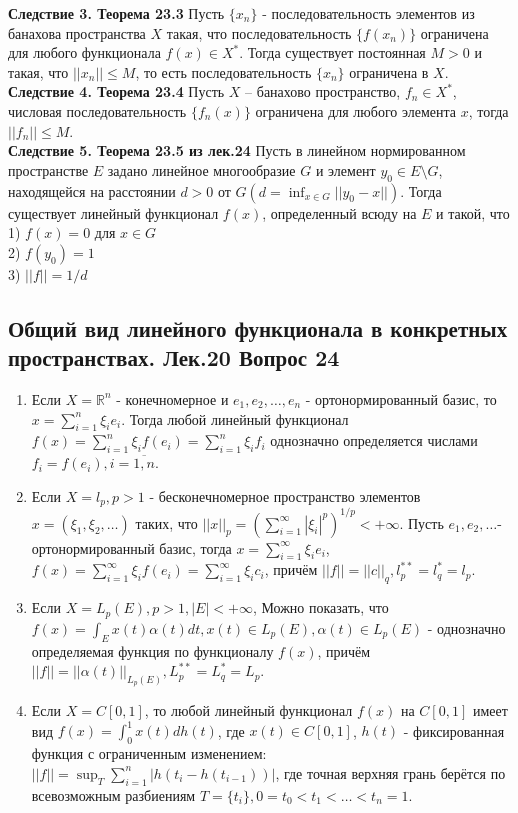 \documentclass{article}
\begin{document}
	\textbf{Следствие 3. Теорема 23.3} Пусть $\{{x}_{n}\}$ - последовательность элементов из банахова пространства $X$ такая, что последовательность $\{f({x}_{n})\}$ ограничена для любого функционала $f(x)\in {X}^{*}$. Тогда существует постоянная $M>0$ и такая, что $||{x}_{n}||\le M$, то есть последовательность $\{{x}_{n}\}$ ограничена в $X$.\\
	\textbf{Следствие 4. Теорема 23.4} Пусть $X$ – банахово пространство, ${f}_{n}\in {X}^{*}$, числовая последовательность $\{{f}_{n}(x)\}$ ограничена для любого элемента $x$, тогда $||{f}_{n}||\le M$.\\
	\textbf{Следствие 5. Теорема 23.5 из лек.24} Пусть в линейном нормированном пространстве $E$ задано линейное многообразие $G$ и элемент ${y}_{0}\in E\setminus G$, находящейся на расстоянии $d>0$ от $G(d=\inf_{x\in G} ||{y}_{0}-x||)$. Тогда существует линейный функционал $f(x)$, определенный всюду на $E$ и такой, что \\
	1) $f(x)=0$ для $x\in G$\\
	2) $f({y}_{0})=1$\\
	3) $||f||=1/d$\\
\subsection{Общий вид линейного функционала в конкретных пространствах. Лек.20 \textbf{Вопрос 24}}
	\begin{enumerate}
		\item Если $X={\mathbb{R}}^{n}$ - конечномерное и ${e}_{1},{e}_{2},\ldots,{e}_{n}$ - ортонормированный базис, то $x=\sum_{i=1}^{n} \xi_{i}{e}_{i}$. Тогда любой линейный функционал $f(x)=\sum_{i=1}^{n} \xi_{i}f({e}_{i})=\sum_{i=1}^{n} \xi_{i}{f}_{i}$ однозначно определяется числами ${f}_{i}=f({e}_{i}), i=\overline{1,n}$.
		\item Если $X={l}_{p},p>1$ - бесконечномерное пространство элементов $x=({\xi}_{1},{\xi}_{2},\ldots)$ таких, что ${||x||}_{p}={(\sum_{i=1}^{\infty} {|{\xi}_{i}|}^{p})}^{1/p}<+\infty$. Пусть ${e}_{1},{e}_{2},\ldots$- ортонормированный базис,
		тогда $x=\sum_{i=1}^{\infty} \xi_{i}{e}_{i}$, $f(x)=\sum_{i=1}^{\infty} \xi_{i}f({e}_{i})=\sum_{i=1}^{\infty} \xi_{i}{c}_{i}$, причём $||f||={||c||}_{q},{l}_{p}^{**}={l}_{q}^{*}={l}_{p}$.
		\item Если $X={L}_{p}(E),p>1,|E|<+\infty$, Можно показать, что $f(x)=\int_{E} x(t)\alpha(t)dt,x(t)\in {L}_{p}(E),\alpha(t)\in {L}_{p}(E)$ - однозначно определяемая функция по
		функционалу $f(x)$, причём $||f||={||\alpha(t)||}_{{L}_{p}(E)},{L}_{p}^{**}={L}_{q}^{*}={L}_{p}$.
		\item Если $X=C[0,1]$, то любой линейный функционал $f(x)$ на $C[0,1]$ имеет вид $f(x)=\int_{0}^{1} x(t)dh(t)$, где $x(t)\in C[0,1]$, $h(t)$ - фиксированная функция с ограниченным изменением: $||f||={\sup}_{T} \sum_{i=1}^{n} |h({t}_{i}-h({t}_{i-1}))|$, где точная верхняя грань берётся по
		всевозможным разбиениям $T=\{{t}_{i}\},0={t}_{0}<{t}_{1}<\ldots<{t}_{n}=1$.
	\end{enumerate}
\end{document}

